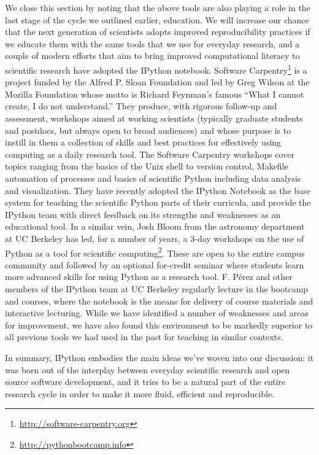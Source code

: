 \documentclass[ChapterTOCs,krantz2]{krantz} %
\theoremstyle{definition}
\begin{document}
We close this section by noting that the above tools are also playing a role in
the last stage of the cycle we outlined earlier, education.  We will increase
our chance that the next generation of scientists adopts improved
reproducibility practices if we educate them with the same tools that we use
for everyday research, and a couple of modern efforts that aim to bring
improved computational literacy to scientific research have adopted the IPython
notebook.  Software Carpentry\footnote{\url{http://software-carpentry.org}} is
a project funded by the Alfred P. Sloan Foundation and led by Greg Wilson at
the Mozilla Foundation whose motto is Richard Feynman's famous ``What I cannot
create, I do not understand.''  They produce, with rigorous follow-up and
assessment, workshops aimed at working scientists (typically graduate students
and postdocs, but always open to broad audiences) and whose purpose is to
instill in them a collection of skills and best practices for effectively using
computing as a daily research tool.  The Software Carpentry workshops cover
topics ranging from the basics of the Unix shell to version control, Makefile
automation of processes and basics of scientific Python including data analysis
and visualization.  They have recently adopted the IPython Notebook as the base
system for teaching the scientific Python parts of their curricula, and provide
the IPython team with direct feedback on its strengths and weaknesses as an
educational tool.  In a similar vein, Josh Bloom from the astronomy department
at UC Berkeley has led, for a number of years, a 3-day workshops on the use of
Python as a tool for scientific
computing\footnote{\url{http://pythonbootcamp.info}}.  These are open to the
entire campus community and followed by an optional for-credit seminar where
students learn more advanced skills for using Python as a research tool.
F. Pérez and other members of the IPython team at UC Berkeley regularly lecture
in the bootcamp and courses, where the notebook is the means for delivery of
course materials and interactive lecturing.  While we have identified a number
of weaknesses and areas for improvement, we have also found this environment to
be markedly superior to all previous tools we had used in the past for teaching
in similar contexts.

In summary, IPython embodies the main ideas we've woven into our discussion: it
was born out of the interplay between everyday scientific research and open
source software development, and it tries to be a natural part of the entire
research cycle in order to make it more fluid, efficient and reproducible.
\end{document}
